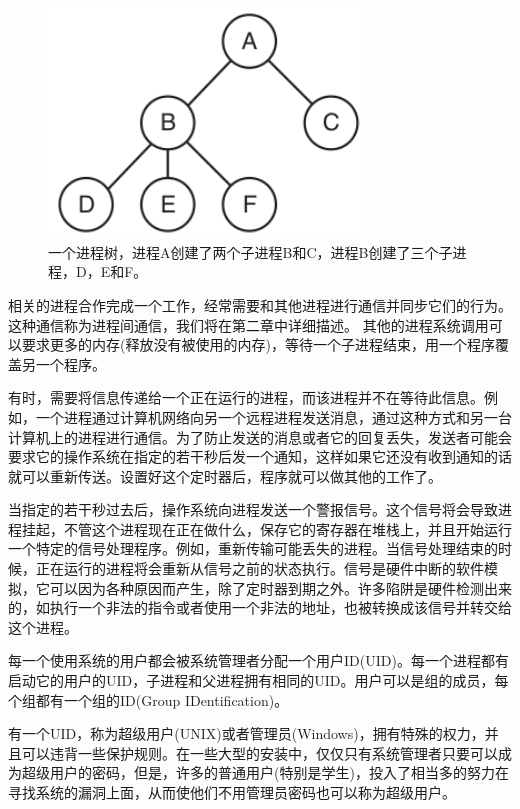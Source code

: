 	\begin{figure}[ht]\small
		\centering
		\includegraphics[width=0.75\textwidth]{FIG/1-13.png}
		\caption{一个进程树，进程A创建了两个子进程B和C，进程B创建了三个子进程，D，E和F。}\label{fig:processtree}
	\end{figure}

	相关的进程合作完成一个工作，经常需要和其他进程进行通信并同步它们的行为。这种通信称为进程间通信，我们将在第二章中详细描述。
	其他的进程系统调用可以要求更多的内存(释放没有被使用的内存)，等待一个子进程结束，用一个程序覆盖另一个程序。
	
	有时，需要将信息传递给一个正在运行的进程，而该进程并不在等待此信息。例如，一个进程通过计算机网络向另一个远程进程发送消息，通过这种方式和另一台计算机上的进程进行通信。为了防止发送的消息或者它的回复丢失，发送者可能会要求它的操作系统在指定的若干秒后发一个通知，这样如果它还没有收到通知的话就可以重新传送。设置好这个定时器后，程序就可以做其他的工作了。
	
	当指定的若干秒过去后，操作系统向进程发送一个警报信号。这个信号将会导致进程挂起，不管这个进程现在正在做什么，保存它的寄存器在堆栈上，并且开始运行一个特定的信号处理程序。例如，重新传输可能丢失的进程。当信号处理结束的时候，正在运行的进程将会重新从信号之前的状态执行。信号是硬件中断的软件模拟，它可以因为各种原因而产生，除了定时器到期之外。许多陷阱是硬件检测出来的，如执行一个非法的指令或者使用一个非法的地址，也被转换成该信号并转交给这个进程。
	
	每一个使用系统的用户都会被系统管理者分配一个用户ID(UID)。每一个进程都有启动它的用户的UID，子进程和父进程拥有相同的UID。用户可以是组的成员，每个组都有一个组的ID(Group IDentification)。

	有一个UID，称为超级用户(UNIX)或者管理员(Windows)，拥有特殊的权力，并且可以违背一些保护规则。在一些大型的安装中，仅仅只有系统管理者只要可以成为超级用户的密码，但是，许多的普通用户(特别是学生)，投入了相当多的努力在寻找系统的漏洞上面，从而使他们不用管理员密码也可以称为超级用户。
	
